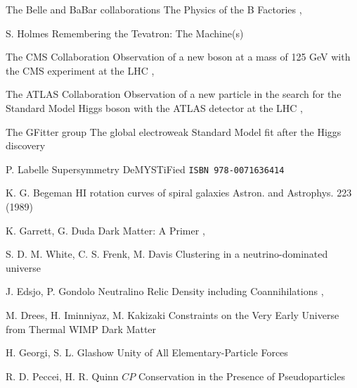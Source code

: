 {The Belle and BaBar collaborations}
{The Physics of the B Factories}
{, }

{S. Holmes}
{Remembering the Tevatron: The Machine(s)}
{}

{The CMS Collaboration}
{Observation of a new boson at a mass of 125 GeV with the CMS experiment at the LHC}
{, }

{The ATLAS Collaboration}
{Observation of a new particle in the search for the Standard Model Higgs boson with the ATLAS detector at the LHC}
{, }

{The GFitter group}
{The global electroweak Standard Model fit after the Higgs discovery}
{}

{P. Labelle}
{Supersymmetry DeMYSTiFied}
{\texttt{ISBN 978-0071636414}}

{K. G. Begeman}
{HI rotation curves of spiral galaxies}
{Astron. and Astrophys. 223 (1989)}

{K. Garrett, G. Duda}
{Dark Matter: A Primer}
{, }

{S. D. M. White, C. S. Frenk, M. Davis}
{Clustering in a neutrino-dominated universe}
{}

{J. Edsjo, P. Gondolo}
{Neutralino Relic Density including Coannihilations}
{, }

{M. Drees, H. Iminniyaz, M. Kakizaki}
{Constraints on the Very Early Universe from Thermal WIMP Dark Matter}
{ }

{H. Georgi, S. L. Glashow}
{Unity of All Elementary-Particle Forces}
{}

{R. D. Peccei, H. R. Quinn}
{$CP$ Conservation in the Presence of Pseudoparticles}
{}

